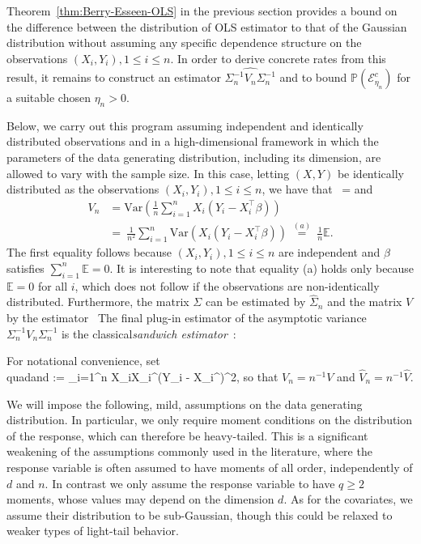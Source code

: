\documentclass{article}
\begin{document}
 
 Theorem~\ref{thm:Berry-Esseen-OLS} in the previous section provides a bound on the difference between the distribution of OLS estimator to that of the Gaussian distribution without assuming any specific dependence structure on the observations $(X_i, Y_i), 1 \le i\le n$. In order to derive concrete rates from this result, it remains to construct an estimator $\widehat{\Sigma_n^{-1}V_n\Sigma_n^{-1}}$ and to bound $\mathbb{P}(\mathcal{E}_{\eta_n}^c)$ for a suitable chosen $\eta_n > 0$. 
 
 Below, we carry out this program assuming independent and identically distributed observations and in a high-dimensional framework in which the parameters of the data generating distribution, including its dimension, are allowed to vary with the sample size. In this case, letting $(X, Y)$ be identically distributed as the observations $(X_i, Y_i), 1\le i\le n$, we have that 
 \ =  
 \]
 and
 \begin{align*}
 V_n &= \mbox{Var}\left(\frac{1}{n}\sum_{i=1}^n X_i(Y_i - X_i^{\top}\beta)\right)\\ 
 ~&=~ \frac{1}{n^2}\sum_{i=1}^n \mbox{Var}(X_i(Y_i - X_i^{\top}\beta)) ~\overset{(a)}{=}~ \frac{1}{n}\mathbb{E}.
 \end{align*}
 The first equality follows because $(X_i, Y_i), 1\le i\le n$ are independent and $\beta$ satisfies $\sum_{i=1}^n \mathbb{E} = 0$. It is interesting to note that equality (a) holds only because $\mathbb{E} = 0$ for all $i$, which does not follow if the observations are non-identically distributed.
 Furthermore,  the matrix $\Sigma$ can be estimated by $\widehat{\Sigma}_n$ and the matrix $V$ by the estimator
 \
 The final plug-in estimator of the
 asymptotic variance $\Sigma_n^{-1}V_n\Sigma_n^{-1}$ is the classical{\em sandwich estimator}~\citep{White1980,Buja14}:
 \
 
 
 
 
 
 
 
 
 
 
 
 
 
 
 
 For notational convenience, set
 \\quad\mbox{and}\quad {} := \sum_{i=1}^n X_iX_i^{\top}(Y_i - X_i^{\top}\widehat{\beta})^2,
 \]
 so that $V_n = n^{-1}V$ and $\widehat{V}_n = n^{-1}\widehat{V}$.
 
 
 We will impose the following, mild, assumptions on the data generating distribution. In particular, we only require moment conditions  on the distribution of the response, which can therefore be heavy-tailed. This is a significant weakening of the assumptions commonly used in the literature, where the response variable is often assumed to have moments of all order, independently of $d$ and $n$. In contrast we only assume the response variable to have $q \geq 2 $ moments, whose values may depend on the dimension $d$.  As for the covariates,  we assume  their distribution to be sub-Gaussian, though this could be  relaxed to weaker types of light-tail behavior.
 
\end{document}
